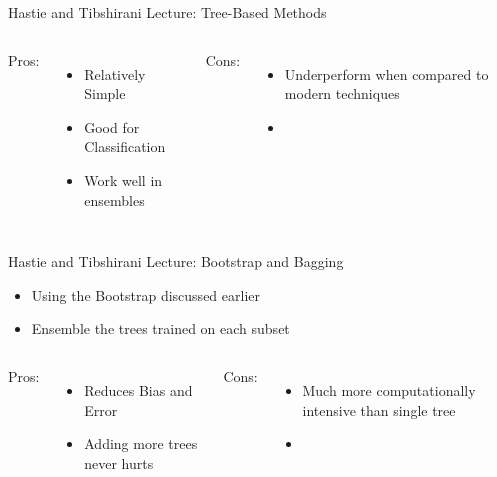 \documentclass{beamer}
\begin{document}
\begin{frame}{Hastie and Tibshirani Lecture: Tree-Based Methods}
		\begin{columns}
		Pros:
		\begin{itemize}
			\item Relatively Simple
			\item Good for Classification
			\item Work well in ensembles
		\end{itemize}
		
		Cons:
		\begin{itemize}
			\item Underperform when compared to modern techniques
			\item[]
		\end{itemize}
	\end{columns}
\end{frame}

\begin{frame}{Hastie and Tibshirani Lecture: Bootstrap and Bagging}
	\begin{itemize}
		\item Using the Bootstrap discussed earlier
		\item Ensemble the trees trained on each subset
	\end{itemize}
	\vspace{1em}
	\begin{columns}
		\column{0.5\textwidth}
		Pros:
		\begin{itemize}
			\item Reduces Bias and Error
			\item Adding more trees never hurts
		\end{itemize}
		
		\column{0.5\textwidth}
		Cons:
		\begin{itemize}
			\item Much more computationally intensive than single tree
			\item[]
		\end{itemize}
	\end{columns}
\end{frame}
\end{document}
